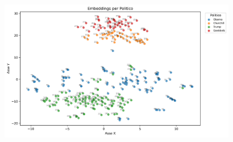 \documentclass{article}
\begin{document}
	\begin{figure}[H]
		\centering
		\includegraphics[width=0.9\textwidth]{immagini/word_embedding}
	\end{figure}
\end{document}

